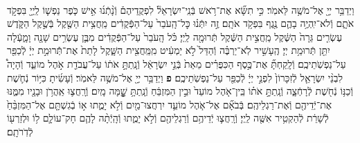 \documentclass[twoside, openany, parskip=half, 11pt]{book}
\begin{document}
\begin{sometimes}
\begin{footnotesize}
\begin{multicols}{2}
\\
וַיְדַבֵּ֥ר יְיָ֖ אֶל־מֹשֶׁ֥ה לֵּאמֹֽר׃ כִּ֣י תִשָּׂ֞א אֶת־רֹ֥אשׁ בְּֿנֵֽי־יִשְׂרָאֵל֘ לִפְקֻֽדֵיהֶם֒ וְֿנָ֨תְֿנ֜וּ אִ֣ישׁ כֹּ֧פֶר נַפְשׁ֛וֹ לַֽיְיָ֖ בִּפְקֹ֣ד אֹתָ֑ם וְֿלֹא־יִֽהְיֶ֥ה בָהֶ֛ם נֶ֖גֶף בִּפְקֹ֥ד אֹתָֽם׃ זֶ֣ה יִתְּֿנ֗וּ כׇּל־הָֽעֹבֵר֙ עַל־הַפְּֿקֻדִ֔ים מַֽחֲצִ֥ית הַשֶּׁ֖קֶל בְּֿשֶׁ֣קֶל הַקֹּ֑דֶשׁ עֶשְׂרִ֤ים גֵּרָה֙ הַשֶּׁ֔קֶל מַֽחֲצִ֣ית הַשֶּׁ֔קֶל תְּֿרוּמָ֖ה לַֽיְיָ׃  כֹּ֗ל הָֽעֹבֵר֙ עַל־הַפְּֿקֻדִ֔ים מִבֶּ֛ן עֶשְׂרִ֥ים שָׁנָ֖ה וָמָ֑עְֿלָה יִתֵּ֖ן תְּֿרוּמַ֥ת יְיָ׃ הֶֽעָשִׁ֣יר לֹֽא־יַרְבֶּ֗ה וְֿהַדַּל֙ לֹ֣א יַמְעִ֔יט מִֽמַּֽחֲצִ֖ית הַשָּׁ֑קֶל לָתֵת֙ אֶת־תְּֿֿרוּמַ֣ת יְיָ֔ לְֿכַפֵּ֖ר עַל־נַפְשֹֽׁתֵיכֶֽם׃ וְֿלָֽקַחְתָּ֞ אֶת־כֶּ֣סֶף הַכִּפֻּרִ֗ים מֵאֵת֙ בְּֿנֵ֣י יִשְׂרָאֵ֔ל וְֿנָֽתַתָּ֣ אֹת֔וֹ עַל־עֲבֹדַ֖ת אֹ֣הֶל מוֹעֵ֑ד וְֿהָיָה֩ לִבְנֵ֨י יִשְׂרָאֵ֤ל לְֿזִכָּרוֹן֙ לִפְנֵ֣י יְיָ֔ לְֿכַפֵּ֖ר עַל־נַפְשֹֽׁתֵיכֶֽם׃ \textbf{פ}
וַיְדַבֵּ֥ר יְיָ֖ אֶל־מֹשֶׁ֥ה לֵּאמֹֽר׃ וְֿעָשִׂ֜יתָ כִּיּ֥וֹר נְֿחֹ֛שֶׁת וְֿכַנּ֥וֹ נְֿחֹ֖שֶׁת לְֿרָחְֿצָ֑ה וְֿנָֽתַתָּ֣ אֹת֗וֹ בֵּֽין־אֹ֤הֶל מוֹעֵד֙ וּבֵ֣ין הַמִּזְבֵּ֔חַ וְֿנָֽתַתָּ֥ שׇׇׇׇׇׇָׁ֖מָּה מָֽיִם׃ וְֿרָֽחֲצ֛וּ אַֽהֲרֹ֥ן וּבָנָ֖יו מִמֶּ֑נּוּ אֶת־יְֿדֵיהֶ֖ם וְֿאֶת־רַגְלֵיהֶֽם׃ בְּֿבֹאָ֞ם אֶל־אֹ֧הֶל מוֹעֵ֛ד יִרְחֲצוּ־מַ֖יִם וְֿלֹ֣א יָמֻ֑תוּ א֣וֹ בְֿגִשְׁתָּ֤ם אֶל־הַמִּזְבֵּ֨חַ֙ לְֿשָׁרֵ֔ת לְֿהַקְטִ֥יר אִשֶּׁ֖ה לַֽיְיָ׃ וְֿרָֽחֲצ֛וּ יְֿדֵיהֶ֥ם וְֿרַגְלֵיהֶ֖ם וְֿלֹ֣א יָמֻ֑תוּ וְֿהָֽיְֿתָ֨ה לָהֶ֧ם חָק־עוֹלָ֛ם ל֥וֹ וּלְזַרְע֖וֹ לְֿדֹֽרֹתָֽם׃


\end{multicols}
\end{footnotesize}
\end{sometimes}
\end{document}
